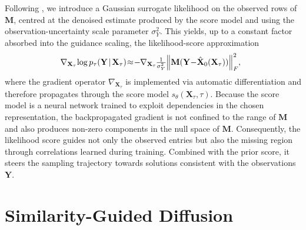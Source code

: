 \documentclass{article}
\begin{document}
Following \cite{chung2023diffusion}, we introduce a Gaussian surrogate likelihood on the observed rows of $\mathbf{M}$, centred at the denoised estimate produced by the score model and using the observation-uncertainty scale parameter $\sigma_Y^2$.
This yields, up to a constant factor absorbed into the guidance scaling, the likelihood-score approximation
\begin{equation}
\hspace{-6pt}
\nabla_{\mathbf{X}_\tau}
\hspace{-1.5pt}
 \log p_\tau(\mathbf{Y}
\hspace{-1.5pt}
  \mid
\hspace{-1.5pt}
   \mathbf{X}_\tau) 
\hspace{-2pt}
 \approx
\hspace{-2pt}
  -
\hspace{-0.5pt}
  \nabla_{\mathbf{X}_\tau}
\hspace{-1pt}
   \tfrac{1}{\sigma_Y^2} 
\hspace{-2pt}
  \left\|\mathbf{M} (\mathbf{Y}
\hspace{-2pt}
   -
\hspace{-2pt}
    \hat{\mathbf{X}}_0(\mathbf{X}_\tau) )\right\|_F^2 
\hspace{-2pt}
    ,
\label{eq:likelihood_gradient}
\end{equation}
where the gradient operator $\nabla_{\mathbf{X}_\tau}$ is implemented via automatic differentiation and therefore propagates through the score model $s_\theta(\mathbf{X}_\tau, \tau)$.
Because the score model is a neural network trained to exploit dependencies in the chosen representation, the backpropagated gradient is not confined to the range of $\mathbf{M}$ and also produces non-zero components in the null space of $\mathbf{M}$.
Consequently, the likelihood score guides not only the observed entries but also the missing region through correlations learned during training.
Combined with the prior score, it steers the sampling trajectory towards solutions consistent with the observations $\mathbf{Y}$.

\vspace{-3pt}
\section{Similarity-Guided Diffusion}
\vspace{-2pt}
\end{document}
